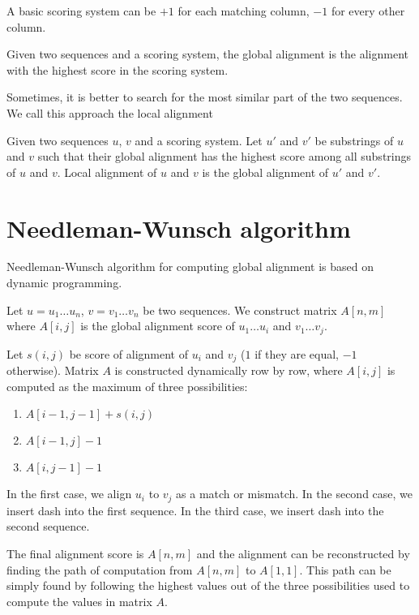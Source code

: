 A basic scoring system can be $+1$ for each matching column, $-1$ for every other column.

\begin{definition}
Given two sequences and a scoring system, the global alignment is the alignment with the highest score in the scoring system.
\end{definition}

Sometimes, it is better to search for the most similar part of the two sequences. We call this approach the local alignment

\begin{definition}
Given two sequences $u$, $v$ and a scoring system. Let $u'$ and $v'$ be substrings of $u$ and $v$ such that their global alignment has the highest score among all substrings of $u$ and $v$. Local alignment of $u$ and $v$ is the global alignment of $u'$ and $v'$.
\end{definition}

\section{Needleman-Wunsch algorithm}
\label{nwalg}
Needleman-Wunsch algorithm \cite{needleman} for computing global alignment is based on dynamic programming. 

Let $u=u_1 \dots u_n$, $v=v_1 \dots v_n$ be two sequences. We construct matrix $A[n,m]$ where $A[i,j]$ is the global alignment score of $u_1 \dots u_i$ and $v_1 \dots v_j$.

Let $s(i,j)$ be score of alignment of $u_i$ and $v_j$ ($1$ if they are equal, $-1$ otherwise).
Matrix $A$ is constructed dynamically row by row, where $A[i,j]$ is computed as the maximum of three possibilities:
\begin{enumerate}
\item $A[i-1,j-1]+s(i,j)$
\item $A[i-1,j]-1$
\item $A[i,j-1]-1$
\end{enumerate}

In the first case, we align $u_i$ to $v_j$ as a match or mismatch. In the second case, we insert dash into the first sequence. In the third case, we insert dash into the second sequence.

The final alignment score is $A[n,m]$ and the alignment can be reconstructed by finding the path of computation from $A[n,m]$ to $A[1,1]$.
This path can be simply found by following the highest values out of the three possibilities used to compute the values in matrix $A$. 

